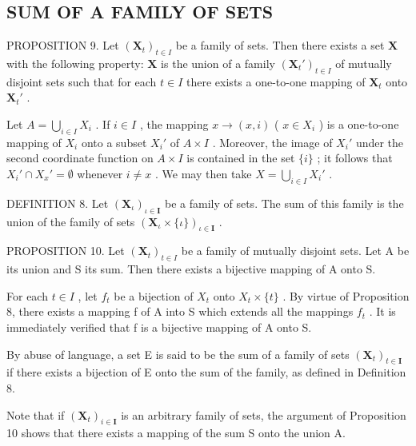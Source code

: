 \subsection{SUM OF A FAMILY OF SETS}

PROPOSITION 9. Let \((\mathbf{X}_t)_{t \in I}\) be a family of sets. Then there exists a set \(\mathbf{X}\) with the following property: \(\mathbf{X}\) is the union of a family \((\mathbf{X}_t')_{t \in I}\) of mutually disjoint sets such that for each \(t \in I\) there exists a one-to-one mapping of \(\mathbf{X}_t\) onto \(\mathbf{X}_t'\) .

Let \(A = \bigcup_{i \in I} X_i\) . If \(i \in I\) , the mapping \(x \to (x, i)\) ( \(x \in X_i\) ) is a one-to-one mapping of \(X_i\) onto a subset \(X_i'\) of \(A \times I\) . Moreover, the image of \(X_i'\) under the second coordinate function on \(A \times I\) is contained in the set \(\{i\}\) ; it follows that \(X_i' \cap X_x' = \emptyset\) whenever \(i \neq x\) . We may then take \(X = \bigcup_{i \in I} X_i'\) .

DEFINITION 8. Let \((\mathbf{X}_{\iota})_{\iota \in \mathbf{I}}\) be a family of sets. The sum of this family is the union of the family of sets \((\mathbf{X}_{\iota} \times \{\iota\})_{\iota \in \mathbf{I}}\) .

PROPOSITION 10. Let \((\mathbf{X}_t)_{t\in I}\) be a family of mutually disjoint sets. Let A be its union and S its sum. Then there exists a bijective mapping of A onto S.

For each \(t \in I\) , let \(f_{t}\) be a bijection of \(X_{t}\) onto \(X_{t} \times \{t\}\) . By virtue of Proposition 8, there exists a mapping f of A into S which extends all the mappings \(f_{t}\) . It is immediately verified that f is a bijective mapping of A onto S.

By abuse of language, a set E is said to be the sum of a family of sets \((\mathbf{X}_{t})_{t\in\mathbf{I}}\) if there exists a bijection of E onto the sum of the family, as defined in Definition 8.

Note that if \((\mathbf{X}_{t})_{i\in\mathbf{I}}\) is an arbitrary family of sets, the argument of Proposition 10 shows that there exists a mapping of the sum S onto the union A.

